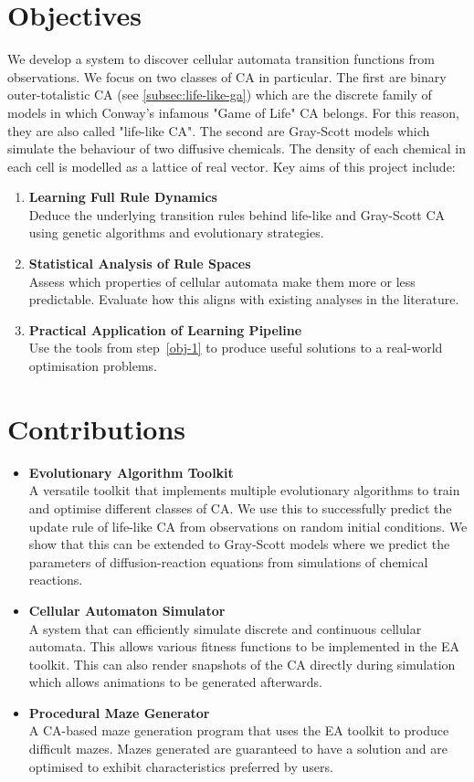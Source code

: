\section{Objectives}
We develop a system to discover cellular automata transition functions from observations. We focus on two classes of CA in particular. The first are binary outer-totalistic CA (see \ref{subsec:life-like-ga}) which are the discrete family of models in which Conway's infamous "Game of Life" CA belongs. For this reason, they are also called "life-like CA". The second are Gray-Scott models which simulate the behaviour of two diffusive chemicals. The density of each chemical in each cell is modelled as a lattice of real vector. Key aims of this project include:
\begin{enumerate}
    \item \textbf{Learning Full Rule Dynamics}\label{obj-1}\\
    Deduce the underlying transition rules behind life-like and Gray-Scott CA using genetic algorithms and evolutionary strategies.
    \item \textbf{Statistical Analysis of Rule Spaces}\\
    Assess which properties of cellular automata make them more or less predictable. Evaluate how this aligns with existing analyses in the literature.
    \item \textbf{Practical Application of Learning Pipeline}\\
    Use the tools from step~\ref{obj-1} to produce useful solutions to a real-world optimisation problems.
\end{enumerate}

\section{Contributions}
\begin{itemize}
    \item \textbf{Evolutionary Algorithm Toolkit}\\ A versatile toolkit that implements multiple evolutionary algorithms to train and optimise different classes of CA. We use this to successfully predict the update rule of life-like CA from observations on random initial conditions. We show that this can be extended to Gray-Scott models where we predict the parameters of diffusion-reaction equations from simulations of chemical reactions.
    \item \textbf{Cellular Automaton Simulator}\\ A system that can efficiently simulate discrete and continuous cellular automata. This allows various fitness functions to be implemented in the EA toolkit. This can also render snapshots of the CA directly during simulation which allows animations to be generated afterwards.
    \item \textbf{Procedural Maze Generator}\\ A CA-based maze generation program that uses the EA toolkit to produce difficult mazes. Mazes generated are guaranteed to have a solution and are optimised to exhibit characteristics preferred by users.
\end{itemize}

